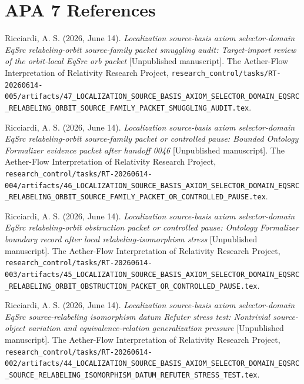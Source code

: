 \documentclass[11pt]{article}
\begin{document}
\section*{APA 7 References}

Ricciardi, A. S. (2026, June 14). \emph{Localization source-basis axiom
selector-domain EqSrc relabeling-orbit source-family packet smuggling
audit: Target-import review of the orbit-local EqSrc orb packet}
[Unpublished manuscript]. The Aether-Flow Interpretation of Relativity
Research Project,
\texttt{research\_control/tasks/RT-20260614-005/artifacts/47\_LOCALIZATION\_SOURCE\_BASIS\_AXIOM\_SELECTOR\_DOMAIN\_EQSRC\_RELABELING\_ORBIT\_SOURCE\_FAMILY\_PACKET\_SMUGGLING\_AUDIT.tex}.

Ricciardi, A. S. (2026, June 14). \emph{Localization source-basis axiom
selector-domain EqSrc relabeling-orbit source-family packet or controlled
pause: Bounded Ontology Formalizer evidence packet after handoff 0046}
[Unpublished manuscript]. The Aether-Flow Interpretation of Relativity
Research Project,
\texttt{research\_control/tasks/RT-20260614-004/artifacts/46\_LOCALIZATION\_SOURCE\_BASIS\_AXIOM\_SELECTOR\_DOMAIN\_EQSRC\_RELABELING\_ORBIT\_SOURCE\_FAMILY\_PACKET\_OR\_CONTROLLED\_PAUSE.tex}.

Ricciardi, A. S. (2026, June 14). \emph{Localization source-basis axiom
selector-domain EqSrc relabeling-orbit obstruction packet or controlled
pause: Ontology Formalizer boundary record after local
relabeling-isomorphism stress} [Unpublished manuscript]. The Aether-Flow
Interpretation of Relativity Research Project,
\texttt{research\_control/tasks/RT-20260614-003/artifacts/45\_LOCALIZATION\_SOURCE\_BASIS\_AXIOM\_SELECTOR\_DOMAIN\_EQSRC\_RELABELING\_ORBIT\_OBSTRUCTION\_PACKET\_OR\_CONTROLLED\_PAUSE.tex}.

Ricciardi, A. S. (2026, June 14). \emph{Localization source-basis axiom
selector-domain EqSrc source-relabeling isomorphism datum Refuter stress
test: Nontrivial source-object variation and equivalence-relation
generalization pressure} [Unpublished manuscript]. The Aether-Flow
Interpretation of Relativity Research Project,
\texttt{research\_control/tasks/RT-20260614-002/artifacts/44\_LOCALIZATION\_SOURCE\_BASIS\_AXIOM\_SELECTOR\_DOMAIN\_EQSRC\_SOURCE\_RELABELING\_ISOMORPHISM\_DATUM\_REFUTER\_STRESS\_TEST.tex}.
\end{document}
